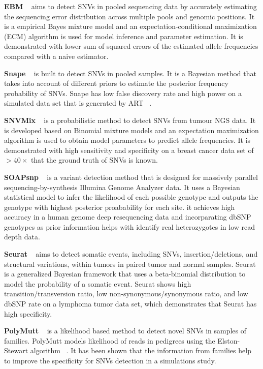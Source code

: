 \documentclass[11pt,reqno]{amsart}
\begin{document}
\textbf{EBM} ~\citep{Zhou2012} aims to detect SNVs in pooled sequencing data by accurately estimating the sequencing error distribution across multiple pools and genomic positions. 
It is a empirical Bayes mixture model and an expectation-conditional maximization (ECM) algorithm is used for model inference and parameter estimation.
It is demonstrated with lower sum of squared errors of the estimated allele frequencies compared with a naive estimator.


\textbf{Snape} ~\citep{Raineri2012} is built to detect SNVs in pooled samples.
It is a Bayesian method that takes into account of different priors to estimate the posterior frequency probability of SNVs.
Snape has low false discovery rate and high power on a simulated data set that is generated by ART ~\citep{huang2012art}.

\textbf{SNVMix} ~\citep{Goya2010} is a probabilistic method to detect SNVs from tumour NGS data.
It is developed based on Binomial mixture models and an expectation maximization algorithm is used to obtain model parameters to predict allele frequencies.
It is demonstrated with high sensitivity and specificity on a breast cancer data set of $> 40 \times$ that the ground truth of SNVs is known.

\textbf{SOAPsnp} ~\citep{Li2009} is a variant detection method that is designed for massively parallel sequencing-by-synthesis Illumina Genome Analyzer data.
It uses a Bayesian statistical model to infer the likelihood of each possible genotype and outputs the genotype with highest posterior proabability for each site.
it achieves high accuracy in a human genome deep resequencing data and incorparating dbSNP genotypes as prior information helps with identify real heterozygotes in low read depth data.

\textbf{Seurat} ~\citep{Christoforides2013} aims to detect somatic events, including SNVs, insertion/deletions, and structural variations, within tumors in paired tumor and normal samples.
Seurat is a generalized Bayesian framework that uses a beta-binomial distribution to model the probability of a somatic event.
Seurat shows high transition/transversion ratio, low non-synonymous/synonymous ratio, and low dbSNP rate on a lymphoma tumor data set, which demonstrates that Seurat has high specificity.

\textbf{PolyMutt} ~\citep{li2012likelihood} is a likelihood based method to detect novel SNVs in samples of families.
PolyMutt models likelihood of reads in pedigrees using the Elston-Stewart algorithm ~\citep{elston1971general}.
It has been shown that the information from families help to improve the specificity for SNVs detection in a simulations study.
\end{document}
